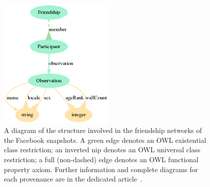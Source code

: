 	\begin{figure}[!ht]
		\centering
			\includegraphics[width=0.5\textwidth]{ontologies/facebook-legacy-AntonioAnzoategui18022013Friendship.ttl/draw}
			    \caption{A diagram of the structure involved in the friendship networks
				of the Facebook snapshots.
				A green edge denotes an OWL existential class restriction;
				an inverted nip denotes an OWL universal class restriction;
				a full (non-dashed) edge denotes an OWL functional property axiom.
				Further information and complete diagrams for each provenance are in the dedicated article~\cite{losd}.}\label{dia}
	\end{figure}



